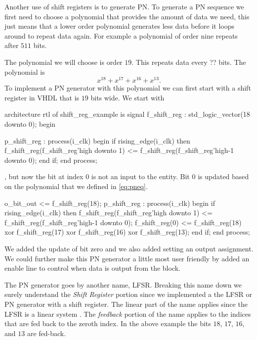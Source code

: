 Another use of shift registers is to generate \ac{PN}. To generate a \ac{PN} sequence we first need to choose a polynomial that provides the amount of data we need, this just means that a lower order polynomial generates less data before it loops around to repeat data again. For example a polynomial of order nine repeats after $511$ bits. 

The polynomial we will choose is order $19$. This repeats data every ?? bits. The polynomial is 
\begin{equation}
x^{18} + x^{17} + x^{16} + x^{13}. 
\label{eq:pneq}
\end{equation}
\noindent
To implement a \ac{PN} generator with this polynomial we can first start with a shift register in \ac{VHDL} that is $19$ bits wide. We start with 

\begin{VHDLlisting}[tabsize=4]
architecture rtl of shift\_reg\_example is
	signal f\_shift\_reg : std\_logic\_vector(18 downto 0);
begin

p\_shift\_reg : process(i\_clk)
begin
	if rising\_edge(i\_clk) then
		f\_shift\_reg(f\_shift\_reg'high downto 1) <= f\_shift\_reg(f\_shift\_reg'high-1 downto 0);
	end if;
end process;
\end{VHDLlisting}

, but now the bit at index $0$ is not an input to the entity. Bit $0$ is updated based on the polynomial that we defined in \ref{eq:pneq}. 	

\begin{VHDLlisting}[tabsize=4]
o\_bit\_out <= f\_shift\_reg(18);
p\_shift\_reg : process(i\_clk)
begin
	if rising\_edge(i\_clk) then
		f\_shift\_reg(f\_shift\_reg'high downto 1) <= f\_shift\_reg(f\_shift\_reg'high-1 downto 0);
		f\_shift\_reg(0) <= f\_shift\_reg(18) xor 
						  f\_shift\_reg(17) xor 
						  f\_shift\_reg(16) xor 
						  f\_shift\_reg(13);
	end if;
end process;
\end{VHDLlisting}

We added the update of bit zero and we also added setting an output assignment. We could further make this \ac{PN} generator a little most user friendly by added an enable line to control when data is output from the block.

The \ac{PN} generator goes by another name, \ac{LFSR}. Breaking this name down we surely understand the \emph{Shift Register} portion since we implemented a the \ac{LFSR} or \ac{PN} generator with a shift register. The linear part of the name applies since the \ac{LFSR} is a linear system \cite{??}. The \emph{feedback} portion of the name applies to the indices that are fed back to the zeroth index. In the above example the bits $18$, $17$, $16$, and $13$ are fed-back.

